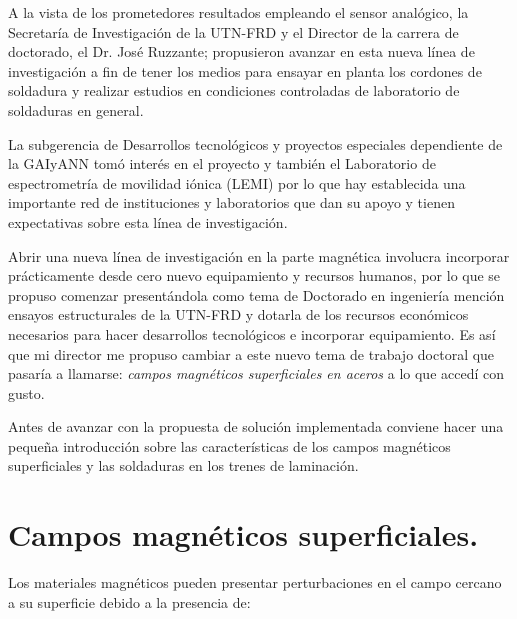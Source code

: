  
A la vista de los prometedores resultados empleando el sensor analógico, la Secretaría de Investigación de la UTN-FRD y el Director de la carrera de doctorado, el Dr. José Ruzzante; propusieron avanzar en esta nueva línea de  investigación a fin de tener los medios para ensayar en planta los cordones de soldadura y realizar estudios en condiciones controladas de laboratorio de soldaduras en general.

La subgerencia de Desarrollos tecnológicos y proyectos especiales dependiente de la GAIyANN tomó interés en el proyecto y también el Laboratorio de espectrometría de movilidad iónica (LEMI) por lo que hay establecida una importante red de instituciones y laboratorios que dan su apoyo y tienen expectativas sobre esta línea de investigación.    

Abrir una nueva línea de investigación en la parte magnética involucra incorporar prácticamente desde cero nuevo equipamiento y recursos humanos, por lo que se propuso comenzar presentándola como tema de Doctorado en ingeniería mención ensayos estructurales de la UTN-FRD y dotarla de los recursos económicos necesarios para hacer desarrollos tecnológicos e incorporar equipamiento. Es así que mi director me propuso cambiar a este nuevo tema de trabajo doctoral que pasaría a llamarse: \emph{campos magnéticos superficiales en aceros} a lo que accedí con gusto.

Antes de avanzar con la propuesta de solución implementada conviene hacer una pequeña introducción sobre las características de los campos magnéticos superficiales y las soldaduras en los trenes de laminación.

\section{Campos magnéticos superficiales.}

Los materiales magnéticos pueden presentar perturbaciones en el campo cercano a su superficie debido a la presencia de: 


